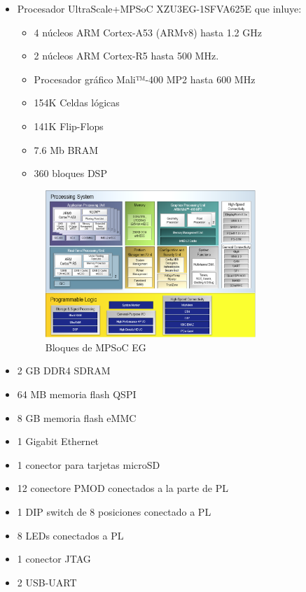 \begin{itemize}
  \item Procesador UltraScale+\texttrademark MPSoC XZU3EG-1SFVA625E que inluye:
  \begin{itemize}
    \item 4 núcleos ARM Cortex-A53 (ARMv8) hasta 1.2 GHz
    \item 2 núcleos ARM Cortex-R5 hasta 500 MHz.
    \item Procesador gráfico Mali™-400 MP2 hasta 600 MHz
    \item 154K Celdas lógicas
    \item 141K Flip-Flops
    \item 7.6 Mb \acrshort{BRAM}
    \item 360 bloques \acrshort{DSP}
    \end{itemize}

    \begin{figure}[h]
    	\centering
    	\includegraphics[width=0.75\textwidth]{recursos/mpsoc_arch.png}
    	\caption{Bloques de MPSoC EG}
    	\label{fig:mpsoc_arch}
    \end{figure}

  \item 2 GB \acrshort{DDR}4 \acrshort{SDRAM}
  \item 64 MB memoria flash \acrshort{QSPI}
  \item 8 GB memoria flash \acrshort{eMMC}
  \item 1 Gigabit Ethernet
  \item 1 conector para tarjetas microSD
  \item 12 conectore \acrshort{PMOD} conectados a la parte de \acrshort{PL}
  \item 1 \acrshort{DIP} switch de 8 posiciones conectado a \acrshort{PL}
  \item 8 LEDs conectados a \acrshort{PL}
  \item 1 conector \acrshort{JTAG}
  \item 2 \acrshort{USB}-\acrshort{UART}
\end{itemize}

